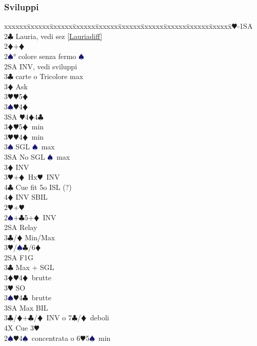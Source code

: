 \documentclass[a4paper,italian]{article}
\newcommand{\BC}{\textcolor{OliveGreen}{$\clubsuit$}}
\newcommand{\BD}{\textcolor{RedOrange}{$\vardiamondsuit$}}
\newcommand{\BH}{\textcolor{Red2}{$\varheartsuit${}}}
\newcommand{\BS}{\textcolor{MidnightBlue}{$\spadesuit${}}}
\newenvironment{bidtable}
{\begin{tabbing}

    xxxxxx\=xxxxxx\=xxxxxx\=xxxxxx\=xxxxxx\=xxxxxx\=xxxxxx\=xxxxxx\=xxxxxx\=xxxxxx\=\kill}
{\end{tabbing} }%
\begin{document}
\begin{multicols*}{2}
    \subsubsection{Sviluppi}

    \begin{bidtable}
        1\BH-1SA\\
        2\BC\> Lauria, vedi sez \ref{Lauriadiff}\\
        2\BD {}+\BD \+\\
        2\BS {}° colore senza fermo \BS \\
        2SA \> INV, vedi sviluppi\+\\
        3\BC {} carte o Tricolore max\+\\
        3\BD \> Ask\+\\
        3\BH {}\BH 5\BD \\
        3\BS {}\BH 4\BD \\
        3SA \BH 4\BD 4\BC \-\-\\
        3\BD {}\BH 5\BD\ min\\
        3\BH {}\BH 4\BD\ min\\
        3\BS \> SGL \BS\ max\\
        3SA \> No SGL \BS\ max\-\\
        3\BD \> INV\\
        3\BH {}+\BD\ Hx\BH\ INV\\
        4\BC \> Cue fit 5o ISL (?)\\
        4\BD \> INV SBIL\-\\
        2\BH {}+\BH \+\\
        2\BS {}+\BC 5+\BD\ INV\+\\
        2SA \> Relay\+\\
        3\BC/\BD \> Min/Max\\
        3\BH/\BS {}\BC /6\BD \-\-\\
        2SA \> F1G\+\\
        3\BC \> Max + SGL\\
        3\BD {}\BH4\BD\ brutte\\
        3\BH \> SO\\
        3\BS {}\BH4\BC\ brutte\\
        3SA \> Max BIL\-\\
        3\BC/\BD {}+\BC/\BD\ INV o 7\BC/\BD\ deboli\\
        4X \> Cue 3\BH \-\\
        2\BS {}\BH 4\BS\ concentrata o 6\BH 5\BS\ min\+\\

\end{bidtable}
\end{multicols*}
\end{document}
